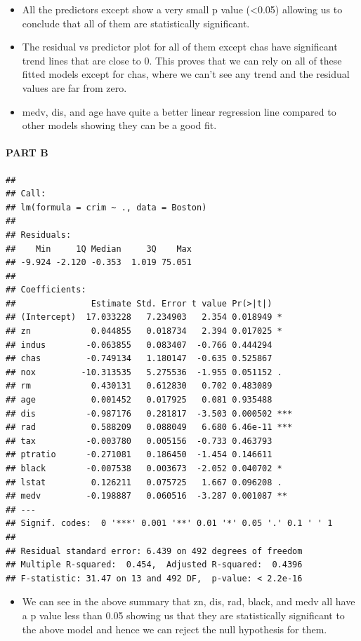 \documentclass[
]{article}
\providecommand{\tightlist}{%
  \setlength{\itemsep}{0pt}\setlength{\parskip}{0pt}}
\begin{document}
\begin{itemize}
\item
  All the predictors except show a very small p value (\textless0.05)
  allowing us to conclude that all of them are statistically
  significant.
\item
  The residual vs predictor plot for all of them except chas have
  significant trend lines that are close to 0. This proves that we can
  rely on all of these fitted models except for chas, where we can't see
  any trend and the residual values are far from zero.
\item
  medv, dis, and age have quite a better linear regression line compared
  to other models showing they can be a good fit.
\end{itemize}

\hypertarget{part-b-1}{%
\paragraph{PART B}\label{part-b-1}}

\begin{verbatim}
## 
## Call:
## lm(formula = crim ~ ., data = Boston)
## 
## Residuals:
##    Min     1Q Median     3Q    Max 
## -9.924 -2.120 -0.353  1.019 75.051 
## 
## Coefficients:
##               Estimate Std. Error t value Pr(>|t|)    
## (Intercept)  17.033228   7.234903   2.354 0.018949 *  
## zn            0.044855   0.018734   2.394 0.017025 *  
## indus        -0.063855   0.083407  -0.766 0.444294    
## chas         -0.749134   1.180147  -0.635 0.525867    
## nox         -10.313535   5.275536  -1.955 0.051152 .  
## rm            0.430131   0.612830   0.702 0.483089    
## age           0.001452   0.017925   0.081 0.935488    
## dis          -0.987176   0.281817  -3.503 0.000502 ***
## rad           0.588209   0.088049   6.680 6.46e-11 ***
## tax          -0.003780   0.005156  -0.733 0.463793    
## ptratio      -0.271081   0.186450  -1.454 0.146611    
## black        -0.007538   0.003673  -2.052 0.040702 *  
## lstat         0.126211   0.075725   1.667 0.096208 .  
## medv         -0.198887   0.060516  -3.287 0.001087 ** 
## ---
## Signif. codes:  0 '***' 0.001 '**' 0.01 '*' 0.05 '.' 0.1 ' ' 1
## 
## Residual standard error: 6.439 on 492 degrees of freedom
## Multiple R-squared:  0.454,  Adjusted R-squared:  0.4396 
## F-statistic: 31.47 on 13 and 492 DF,  p-value: < 2.2e-16
\end{verbatim}

\begin{itemize}
\tightlist
\item
  We can see in the above summary that zn, dis, rad, black, and medv all
  have a p value less than 0.05 showing us that they are statistically
  significant to the above model and hence we can reject the null
  hypothesis for them.
\end{itemize}
\end{document}
